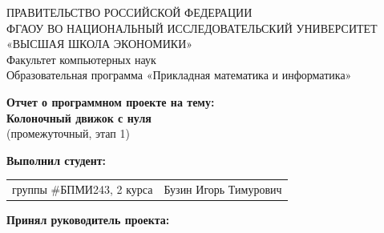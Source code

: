 \begin{titlepage}
\newpage

{
\begin{center}
ПРАВИТЕЛЬСТВО РОССИЙСКОЙ ФЕДЕРАЦИИ\\
ФГАОУ ВО НАЦИОНАЛЬНЫЙ ИССЛЕДОВАТЕЛЬСКИЙ УНИВЕРСИТЕТ\\
«ВЫСШАЯ ШКОЛА ЭКОНОМИКИ»
\\
\bigskip
Факультет компьютерных наук\\
Образовательная программа «Прикладная математика и информатика»
\end{center}
}

\begin{center}
{\bf Отчет о программном проекте на тему:}\\
{\bf Колоночный движок с нуля}\\
(промежуточный, этап 1)
\end{center}

\vspace{2em}

{\bf Выполнил студент: \vspace{2mm}}

{
\begin{tabular}{l@{\hskip 1.5cm}l}
группы \#БПМИ243, 2 курса & Бузин Игорь Тимурович \\
\end{tabular}}


\vspace{1em}
{\bf Принял руководитель проекта: \vspace{2mm}}


\end{titlepage}

